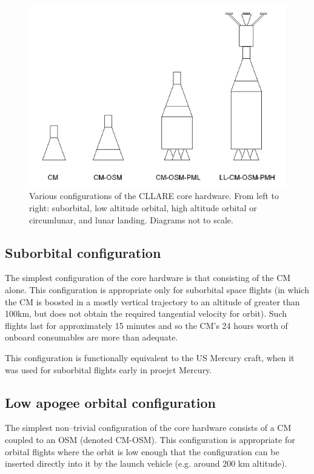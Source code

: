 \documentclass{report}
\begin{document}
\begin{figure}[h] \label{fig:configs}
\centering
\includegraphics[scale=0.6]{images/cllare_hardware_configs}
\caption{Various configurations of the CLLARE core hardware.  From left to right: suborbital, low altitude orbital, high altitude orbital or circumlunar, and lunar landing.  Diagrams not to scale.}
\end{figure}

\subsection{Suborbital configuration}

The simplest configuration of the core hardware is that consisting of the CM alone.  This configuration is appropriate only for suborbital space flights (in which the CM is boosted in a mostly vertical trajectory to an altitude of greater than 100km, but does not obtain the required tangential velocity for orbit).  Such flights last for approximately 15 minutes and so the CM's 24 hours worth of onboard consumables are more than adequate.
 
This configuration is functionally equivalent to the US Mercury craft, when it was used for suborbital flights early in proejct Mercury.

\subsection{Low apogee orbital configuration}

The simplest non--trivial configuration of the core hardware consists of a CM coupled to an OSM (denoted CM-OSM).  This configuration is appropriate for orbital flights where the orbit is low enough that the configuration can be inserted directly into it by the launch vehicle (e.g. around 200 km altitude).
\end{document}
